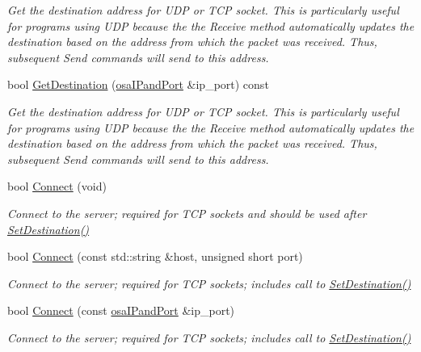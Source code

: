 \begin{DoxyCompactItemize}
\begin{DoxyCompactList}\small\item\em Get the destination address for U\-D\-P or T\-C\-P socket. This is particularly useful for programs using U\-D\-P because the the Receive method automatically updates the destination based on the address from which the packet was received. Thus, subsequent Send commands will send to this address. \end{DoxyCompactList}\item 
bool \hyperlink{classosa_socket_aa8030ca721b7d095cf26ca40e6d237a3}{Get\-Destination} (\hyperlink{structosa_i_pand_port}{osa\-I\-Pand\-Port} \&ip\-\_\-port) const 
\begin{DoxyCompactList}\small\item\em Get the destination address for U\-D\-P or T\-C\-P socket. This is particularly useful for programs using U\-D\-P because the the Receive method automatically updates the destination based on the address from which the packet was received. Thus, subsequent Send commands will send to this address. \end{DoxyCompactList}\item 
bool \hyperlink{classosa_socket_a26e1010cd5c499ed8b0b3ab6a43a50cd}{Connect} (void)
\begin{DoxyCompactList}\small\item\em Connect to the server; required for T\-C\-P sockets and should be used after \hyperlink{classosa_socket_a5a02b283355bf2beff6217bb2e01c03a}{Set\-Destination()} \end{DoxyCompactList}\item 
bool \hyperlink{classosa_socket_a003dbb8706ca2a332b8f2a8187626847}{Connect} (const std\-::string \&host, unsigned short port)
\begin{DoxyCompactList}\small\item\em Connect to the server; required for T\-C\-P sockets; includes call to \hyperlink{classosa_socket_a5a02b283355bf2beff6217bb2e01c03a}{Set\-Destination()} \end{DoxyCompactList}\item 
bool \hyperlink{classosa_socket_a90a8bc0002ea1bcdd3c1a48c9f7c1252}{Connect} (const \hyperlink{structosa_i_pand_port}{osa\-I\-Pand\-Port} \&ip\-\_\-port)
\begin{DoxyCompactList}\small\item\em Connect to the server; required for T\-C\-P sockets; includes call to \hyperlink{classosa_socket_a5a02b283355bf2beff6217bb2e01c03a}{Set\-Destination()} \end{DoxyCompactList}\item 

\end{DoxyCompactItemize}
